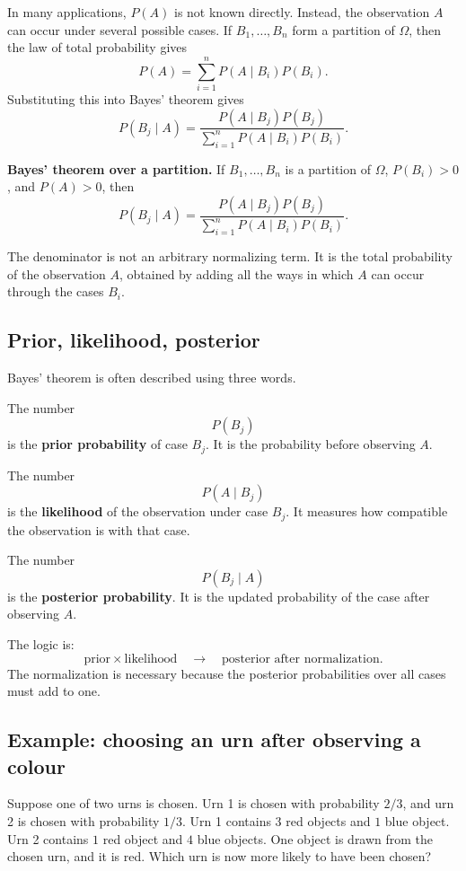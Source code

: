 In many applications, \(P(A)\) is not known directly. Instead, the observation
\(A\) can occur under several possible cases. If \(B_1,
\ldots,B_n\) form a
partition of \(\Omega\), then the law of total probability gives
\[
P(A)=\sum_{i=1}^n P(A\mid B_i)P(B_i).
\]
Substituting this into Bayes' theorem gives
\[
P(B_j\mid A)=
\frac{P(A\mid B_j)P(B_j)}
{\sum_{i=1}^n P(A\mid B_i)P(B_i)}.
\]

\begin{theorembox}
\textbf{Bayes' theorem over a partition.} If \(B_1,
\ldots,B_n\) is a partition
of \(\Omega\), \(P(B_i)>0\), and \(P(A)>0\), then
\[
P(B_j\mid A)=
\frac{P(A\mid B_j)P(B_j)}
{\sum_{i=1}^n P(A\mid B_i)P(B_i)}.
\]
\end{theorembox}

The denominator is not an arbitrary normalizing term. It is the total probability
of the observation \(A\), obtained by adding all the ways in which \(A\) can
occur through the cases \(B_i\).

\subsection*{Prior, likelihood, posterior}

Bayes' theorem is often described using three words.

The number
\[
P(B_j)
\]
is the \textbf{prior probability} of case \(B_j\). It is the probability before
observing \(A\).

The number
\[
P(A\mid B_j)
\]
is the \textbf{likelihood} of the observation under case \(B_j\). It measures how
compatible the observation is with that case.

The number
\[
P(B_j\mid A)
\]
is the \textbf{posterior probability}. It is the updated probability of the case
after observing \(A\).

The logic is:
\[
\text{prior}\times\text{likelihood}\quad\longrightarrow\quad\text{posterior after normalization}.
\]
The normalization is necessary because the posterior probabilities over all
cases must add to one.

\subsection*{Example: choosing an urn after observing a colour}

Suppose one of two urns is chosen. Urn 1 is chosen with probability \(2/3\), and
urn 2 is chosen with probability \(1/3\). Urn 1 contains \(3\) red objects and
\(1\) blue object. Urn 2 contains \(1\) red object and \(4\) blue objects. One
object is drawn from the chosen urn, and it is red. Which urn is now more likely
to have been chosen?

